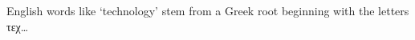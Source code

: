 \raggedright
English words like `technology' stem from a
Greek root beginning with the letters τεχ\dots
